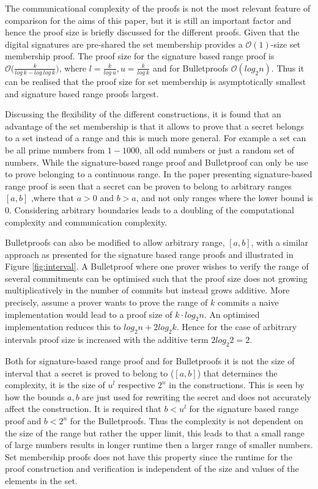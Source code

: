 The communicational complexity of the proofs is not the most relevant feature of comparison for the aims of this paper, but it is still an important factor and hence the proof size is briefly discussed  for the different proofs. Given that the digital signatures are pre-shared the set membership provides a $\mathcal{O}(1)$-size set membership proof. The proof size for the signature based range proof is $\mathcal{O}\big(\frac{k}{log\: k- log\:log\:k}\big)$, where $l = \frac{k}{log\: u}, u = \frac{k}{log\: k}$ and for Bulletproofs $\mathcal{O}(log_2n)$. Thus it can be realised that the proof size for set membership is asymptotically smallest and signature based range proofs largest. 

Discussing the flexibility of the different constructions, it is found that  an advantage of the set membership is that it allows to prove that a secret belongs to a set instead of a range and this is much more general. For example a set can be all prime numbers from $1-1000$, all odd numbers or just a random set of numbers. While the signature-based range proof and Bulletproof can only be use to prove belonging to a continuous range. In the paper presenting signature-based range proof is seen that a secret can be proven to belong to arbitrary ranges $[a,b]$ ,where that $a>0$ and $b>a$, and not only ranges where the lower bound is $0$. Considering arbitrary boundaries leads to a doubling of the computational complexity and communication complexity. 

Bulletproofs can also be modified to allow arbitrary range, $[a,b]$, with a similar approach as presented for the signature based range proofs and illustrated in Figure \ref{fig:interval}. A Bulletproof where one prover wishes to verify the range of several commitments can be optimised such that the  proof size does not growing multiplicatively in the number of commits but instead grows additive. More precisely, assume a prover wants to prove the range of $k$ commits a naive implementation would lead to a proof size of $k\cdot log_2 n $. An optimised implementation reduces this to $log_2 n + 2 log_2 k$.  Hence for the case of arbitrary intervals  proof size is increased with the additive term $2log_2 2 = 2$. 

Both for signature-based range proof and for Bulletproofs it is not the  size of interval that a secret is proved to belong to ($[a,b]$) that determines the complexity, it is the size of $u^l$ respective $2^n$ in the constructions. This is seen by how the bounds $a,b$ are just used for rewriting the secret and does not accurately affect the construction.
It is required that $b< u^l$ for the signature based range proof and $b<2^n$ for the Bulletproofs. Thus the complexity is not dependent on the size of the range but rather the upper limit, this leads to that a small range of large numbers results in longer runtime then a larger range of smaller numbers. Set membership proofs does not have this property since the runtime for the proof construction and verification is independent of the size and values of the elements in the set. 

